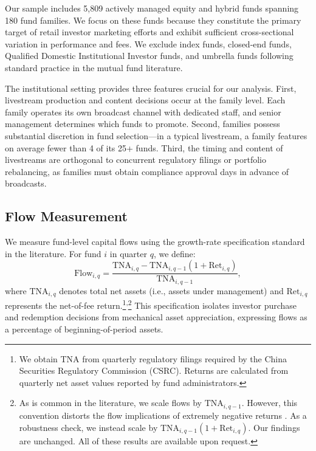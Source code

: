 \documentclass[12pt]{article}
\begin{document}
Our sample includes 5,809 actively managed equity and hybrid funds spanning 180 fund families. We focus on these funds because they constitute the primary target of retail investor marketing efforts and exhibit sufficient cross-sectional variation in performance and fees. We exclude index funds, closed-end funds, Qualified Domestic  Institutional Investor funds, and umbrella funds following standard practice in the mutual fund literature.

The institutional setting provides three features crucial for our analysis. First, livestream production and content decisions occur at the family level. Each family operates its own broadcast channel with dedicated staff, and senior management determines which funds to promote. Second, families possess substantial discretion in fund selection---in a typical livestream, a family features on average fewer than 4 of its 25+ funds. Third, the timing and content of livestreams are orthogonal to concurrent regulatory filings or portfolio rebalancing, as families must obtain compliance approval days in advance of broadcasts.

\subsection{Flow Measurement}\label{subsec:flows}

We measure fund-level capital flows using the growth-rate specification standard in the literature. For fund $i$ in quarter $q$, we define:
\begin{equation}
    \label{eq:fund_flow_twfe}
    \text{Flow}_{i,q} = \frac{\text{TNA}_{i,q} - \text{TNA}_{i,q-1}(1 + \text{Ret}_{i,q})}{\text{TNA}_{i,q-1}},
\end{equation}
where $\text{TNA}_{i,q}$ denotes total net assets (i.e., assets under management) and $\text{Ret}_{i,q}$ represents the net-of-fee return.\footnote{We obtain TNA from quarterly regulatory filings required by the China Securities Regulatory Commission (CSRC). Returns are calculated from quarterly net asset values reported by fund administrators.}\textsuperscript{,}\footnote{As is common in the literature, we scale flows by $\text{TNA}_{i,q-1}$. However, this convention distorts the flow implications of extremely negative returns \citep[see][]{berk2004mutual}. As a robustness check, we instead scale by $\text{TNA}_{i,q-1}(1+\text{Ret}_{i,q})$. Our findings are unchanged. All of these results are available upon request.} This specification isolates investor purchase and redemption decisions from mechanical asset appreciation, expressing flows as a percentage of beginning-of-period assets.
\end{document}
